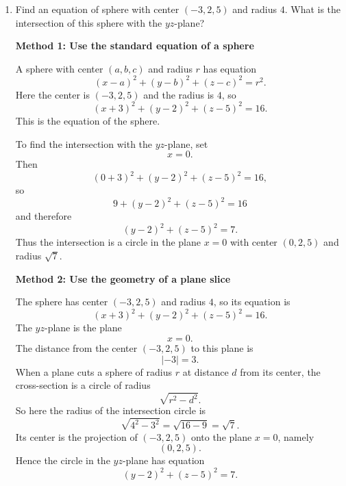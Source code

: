 \documentclass[a4paper,12pt,twocolumn]{article}
\newenvironment{solutionbox}{\begin{framed}}{\end{framed}}
\begin{document}
\begin{enumerate}[label=\textbf{\arabic*.}, leftmargin=2em, itemsep=1.2em]
\begin{solutionbox}
\textbf{(b)} Let
\[
c_n=
\left(
\frac{1\cdot 3\cdot 5\cdots(2n-1)}{2\cdot 4\cdot 6\cdots 2n}
\right)^2.
\]
Then \(c_1=\frac14\), and because each factor \(\frac{2j-1}{2j}<1\), we have
\[
c_n\le \frac14\qquad (n\ge 1).
\]
Therefore
\[
T=
2\pi\sqrt{\frac{L}{g}}
\left(1+c_1k^2+c_2k^4+\cdots\right)
\ge
2\pi\sqrt{\frac{L}{g}}\left(1+\frac14k^2\right),
\]
and also
\[
T\le
2\pi\sqrt{\frac{L}{g}}
\left(1+\frac14k^2+\frac14k^4+\frac14k^6+\cdots\right)
=
2\pi\sqrt{\frac{L}{g}}\frac{4-3k^2}{4-4k^2}.
\]
So the same inequality from part (b) follows.

\textbf{(c)} The numerical estimates are therefore the same as in Method 1:
\[
T\approx 2.0099\text{ s}\qquad (\theta_0=10^\circ),
\]
and
\[
2.0705\text{ s}\lesssim T\lesssim 2.0800\text{ s}
\qquad (\theta_0=42^\circ).
\]

\medskip
\textbf{Answer:}
\[
\boxed{
T=
2\pi\sqrt{\frac{L}{g}}
\left[
1+\frac{1^2}{2^2}k^2+\frac{1^2 3^2}{2^2 4^2}k^4+\cdots
\right]
}
\]
and
\[
\boxed{
2\pi\sqrt{\frac{L}{g}}\left(1+\frac14k^2\right)
\le T\le
2\pi\sqrt{\frac{L}{g}}\frac{4-3k^2}{4-4k^2}.
}
\]
For \(L=1\), this gives \(T\approx 2.0099\) s when \(\theta_0=10^\circ\), and
\[
2.0705\text{ s}\lesssim T\lesssim 2.0800\text{ s}
\]
when \(\theta_0=42^\circ\).
\end{solutionbox}

\setcounter{enumi}{2}
\item Find an equation of sphere with center \((-3,2,5)\) and radius \(4\). What is the intersection of this sphere with the \(yz\)-plane?

\begin{solutionbox}
\textbf{Method 1: Use the standard equation of a sphere}

A sphere with center \((a,b,c)\) and radius \(r\) has equation
\[
(x-a)^2+(y-b)^2+(z-c)^2=r^2.
\]
Here the center is \((-3,2,5)\) and the radius is \(4\), so
\[
(x+3)^2+(y-2)^2+(z-5)^2=16.
\]
This is the equation of the sphere.

To find the intersection with the \(yz\)-plane, set
\[
x=0.
\]
Then
\[
(0+3)^2+(y-2)^2+(z-5)^2=16,
\]
so
\[
9+(y-2)^2+(z-5)^2=16
\]
and therefore
\[
(y-2)^2+(z-5)^2=7.
\]
Thus the intersection is a circle in the plane \(x=0\) with center \((0,2,5)\) and radius \(\sqrt{7}\).
\end{solutionbox}

\begin{solutionbox}
\textbf{Method 2: Use the geometry of a plane slice}

The sphere has center \((-3,2,5)\) and radius \(4\), so its equation is
\[
(x+3)^2+(y-2)^2+(z-5)^2=16.
\]
The \(yz\)-plane is the plane
\[
x=0.
\]
The distance from the center \((-3,2,5)\) to this plane is
\[
|-3|=3.
\]
When a plane cuts a sphere of radius \(r\) at distance \(d\) from its center, the cross-section is a circle of radius
\[
\sqrt{r^2-d^2}.
\]
So here the radius of the intersection circle is
\[
\sqrt{4^2-3^2}=\sqrt{16-9}=\sqrt{7}.
\]
Its center is the projection of \((-3,2,5)\) onto the plane \(x=0\), namely
\[
(0,2,5).
\]
Hence the circle in the \(yz\)-plane has equation
\[
(y-2)^2+(z-5)^2=7.
\]


\end{solutionbox}
\end{enumerate}
\end{document}
